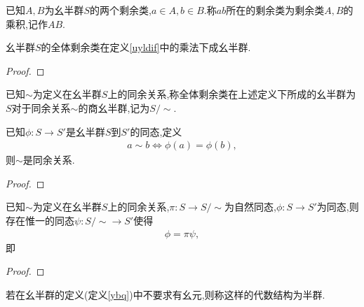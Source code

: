 \begin{definition}[剩余类的乘法]\label{uyldif}
    已知$A,B$为幺半群$S$的两个剩余类,$a\in A,b\in B$.称$ab$所在的剩余类为剩余类$A,B$的乘积,记作$AB$.
\end{definition}
\begin{proposition}
    幺半群$S$的全体剩余类在定义\ref{uyldif}中的乘法下成幺半群.
\end{proposition}
\begin{proof}
    \stars
\end{proof}
\begin{definition}[商幺半群]
    已知$\sim$为定义在幺半群$S$上的同余关系,称全体剩余类在上述定义下所成的幺半群为$S$对于同余关系$\sim$的商幺半群,记为$S/\sim$.
\end{definition}
\begin{theorem}
    已知$\phi:S\to S'$是幺半群$S$到$S'$的同态,定义\begin{align*}
        a\sim b\iff\phi(a)=\phi(b),
    \end{align*}则$\sim$是同余关系.
\end{theorem}
\begin{proof}
    \stars
\end{proof}
\begin{theorem}
    已知$\sim$为定义在幺半群$S$上的同余关系,$\pi:S\to S/\sim$为自然同态,$\phi:S\to S'$为同态,则存在惟一的同态$\psi:S/\sim\to S'$使得\begin{align*}
        \phi=\pi\psi,
    \end{align*}即\begin{center}
    \end{center}
\end{theorem}
\begin{proof}
    \stars
\end{proof}
\begin{definition}[半群]
    若在幺半群的定义(定义\ref{ybq})中不要求有幺元,则称这样的代数结构为半群.
\end{definition}